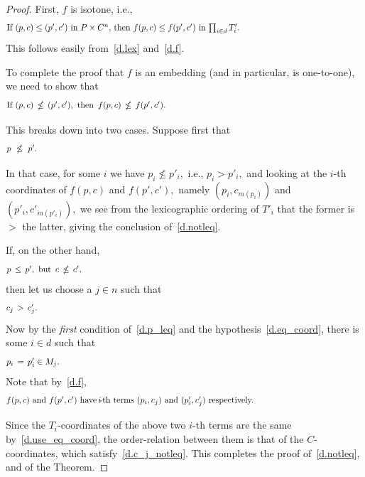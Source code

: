 \documentclass[10pt,a4paper]{amsart}
\begin{document}
\begin{proof}
First, $f$ is isotone, i.e.,
%
\begin{equation}\begin{minipage}[c]{35pc}\label{d.f_isotone}
If $(p,c) \leq (p',c')$ in $P\times C^n,$ then
$f(p,c) \leq f(p',c')$ in $\prod_{i\in d} T'_i.$
\end{minipage}\end{equation}
%
This follows easily from~\eqref{d.lex} and~\eqref{d.f}.

To complete the proof that $f$ is an embedding
(and in particular, is one-to-one), we need to show that
%
\begin{equation}\begin{minipage}[c]{35pc}\label{d.notleq}
If $(p,c)\,\nleq\,(p',c'),$ \,then\, $f(p,c)\,\nleq\,f(p',c').$
\end{minipage}\end{equation}

This breaks down into two cases.
Suppose first that
%
\begin{equation}\begin{minipage}[c]{35pc}\label{d.p_notleq}
$p\ \nleq\ p'.$
\end{minipage}\end{equation}

In that case, for some $i$ we have $p_i\nleq p'_i,$
i.e., $p_i> p'_i,$ and
looking at the $\!i\!$-th coordinates of $f(p,c)$ and $f(p',c'),$
namely $(p_i,c_{m(p_i)})$ and $(p'_i,c'_{m(p'_i)}),$
we see from the lexicographic ordering of $T'_i$
that the former is $>$ the latter,
giving the conclusion of~\eqref{d.notleq}.

If, on the other hand,
%
\begin{equation}\begin{minipage}[c]{35pc}\label{d.p_leq}
$p\,\leq\,p',$ \,but\, $c\,\nleq\,c',$
\end{minipage}\end{equation}
%
then let us choose a $j\in n$ such that
%
\begin{equation}\begin{minipage}[c]{35pc}\label{d.c_j_notleq}
$c_j\,>\,c'_j.$
\end{minipage}\end{equation}
%
Now by the {\em first} condition of~\eqref{d.p_leq} and
the hypothesis~\eqref{d.eq_coord}, there is some $i\in d$ such that
%
\begin{equation}\begin{minipage}[c]{35pc}\label{d.use_eq_coord}
$p_i\,=\,p'_i\in M_j.$
\end{minipage}\end{equation}
%
Note that by~\eqref{d.f},
%
\begin{equation}\begin{minipage}[c]{35pc}\label{d.ith_coords}
$f(p,c)$ and $f(p',c')$ have $\!i\!$-th terms
$(p_i,c_j)$ and $(p'_i,c'_j)$ respectively.
\end{minipage}\end{equation}

Since the $\!T_i\!$-coordinates of the above two $\!i\!$-th terms
are the same by~\eqref{d.use_eq_coord}, the order-relation
between them is
that of the $\!C\!$-coordinates, which satisfy~\eqref{d.c_j_notleq}.
This completes the proof of~\eqref{d.notleq}, and of the Theorem.
\end{proof}
\end{document}
